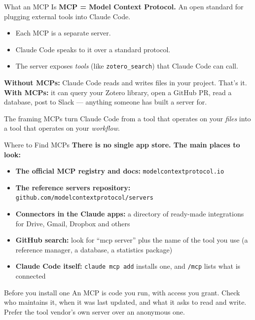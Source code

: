 \documentclass[aspectratio=169, 11pt]{beamer}
\begin{document}
\begin{frame}{What an MCP Is}
  \textbf{MCP = Model Context Protocol.} An open standard for plugging external tools into Claude Code.

  \vspace{0.6em}
  \begin{itemize}
    \item Each MCP is a separate server.
    \item Claude Code speaks to it over a standard protocol.
    \item The server exposes \emph{tools} (like \texttt{zotero\_search}) that Claude Code can call.
  \end{itemize}

  \vspace{0.8em}
  \textbf{Without MCPs:} Claude Code reads and writes files in your project. That's it.\\[0.2em]
  \textbf{With MCPs:} it can query your Zotero library, open a GitHub PR, read a database, post to Slack --- anything someone has built a server for.

  \vspace{0.8em}
  \begin{block}{The framing}
    MCPs turn Claude Code from a tool that operates on your \emph{files} into a tool that operates on your \emph{workflow}.
  \end{block}
\end{frame}


\begin{frame}[fragile]{Where to Find MCPs}
  \textbf{There is no single app store. The main places to look:}

  \vspace{0.4em}
  \begin{itemize}
    \item \textbf{The official MCP registry and docs:} \texttt{modelcontextprotocol.io}
    \item \textbf{The reference servers repository:} \texttt{github.com/modelcontextprotocol/servers}
    \item \textbf{Connectors in the Claude apps:} a directory of ready-made integrations for Drive, Gmail, Dropbox and others
    \item \textbf{GitHub search:} look for ``mcp server'' plus the name of the tool you use (a reference manager, a database, a statistics package)
    \item \textbf{Claude Code itself:} \texttt{claude mcp add} installs one, and \texttt{/mcp} lists what is connected
  \end{itemize}

  \vspace{0.5em}
  \begin{alertblock}{Before you install one}
    An MCP is code you run, with access you grant. Check who maintains it, when it was last updated, and what it asks to read and write. Prefer the tool vendor's own server over an anonymous one.
  \end{alertblock}
\end{frame}
\end{document}
